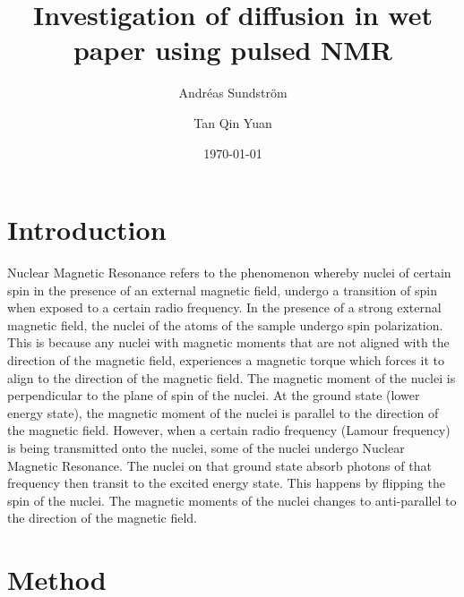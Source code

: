 \documentclass[11pt,a4paper, 
english, swedish %
]{article}
\begin{document}


\title{Investigation of diffusion in wet paper using pulsed NMR}
\author{Andréas Sundström \and Tan Qin Yuan}
\date{\today}

\maketitle


\begin{abstract} 


\end{abstract}




\section{Introduction}

Nuclear Magnetic Resonance refers to the phenomenon whereby nuclei of certain spin in the presence of an external magnetic field, undergo a transition of spin when exposed to a certain radio frequency. In the presence of a strong external magnetic field, the nuclei of the atoms of the sample undergo spin polarization. This is because any nuclei with magnetic moments that are not aligned with the direction of the magnetic field, experiences a magnetic torque which forces it to align to the direction of the magnetic field. The magnetic moment of the nuclei is perpendicular to the plane of spin of the nuclei. At the ground state (lower energy state), the magnetic moment of the nuclei is parallel to the direction of the magnetic field. However, when a certain radio frequency (Lamour frequency) is being transmitted onto the nuclei, some of the nuclei undergo Nuclear Magnetic Resonance. The nuclei on that ground state absorb photons of that frequency then transit to the excited energy state. This happens by flipping the spin of the nuclei. The magnetic moments of the nuclei changes to anti-parallel to the direction of the magnetic field.   
\section{Method}
\end{document}
